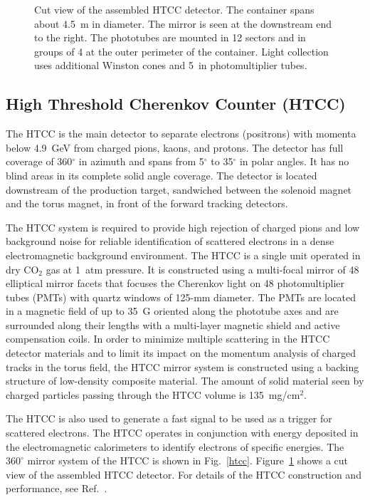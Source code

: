 \documentclass[final,3p,twocolumn]{elsarticle}
\begin{document}
\begin{figure}[htbp!]
\caption{Cut view of the assembled HTCC detector. The container spans about 4.5~m in diameter. The mirror is
seen at the downstream end to the right. The phototubes are mounted in 12 sectors and in groups of 4 at the outer
perimeter of the container. Light collection uses additional Winston cones and 5~in photomultiplier tubes.}
\label{HTCC-container}
\end{figure}

\subsection{High Threshold Cherenkov Counter (HTCC)}

The HTCC is the main detector to separate electrons (positrons) with momenta below 4.9~GeV from charged pions,
kaons, and protons. The detector has full coverage of 360$^\circ$ in azimuth and spans from 5$^\circ$ to 35$^\circ$
in polar angles. It has no blind areas in its complete solid angle coverage. The detector is located downstream of the
production target, sandwiched between the solenoid magnet and the torus magnet, in front of the forward tracking
detectors. 

The HTCC system is required to provide high rejection of charged pions and low background noise for reliable 
identification of scattered electrons in a dense electromagnetic background environment. The HTCC is a single unit
operated in dry CO$_2$ gas at 1~atm pressure. It is constructed using a multi-focal mirror of 48 elliptical mirror
facets that focuses the Cherenkov light on 48 photomultiplier tubes (PMTs) with quartz windows of 125-mm diameter.
The PMTs are located in a magnetic field of up to 35~G oriented along the phototube axes and are surrounded along
their lengths with a multi-layer magnetic shield and active compensation coils. In order to minimize multiple scattering
in the HTCC detector materials and to limit its impact on the momentum analysis of charged tracks in the torus field,
the HTCC mirror system is constructed using a backing structure of low-density composite material. The amount of
solid material seen by charged particles passing through the HTCC volume is 135~mg/cm$^2$. 

The HTCC is also used to generate a fast signal to be used as a trigger for scattered electrons. The HTCC operates
in conjunction with energy deposited in the electromagnetic calorimeters to identify electrons of specific energies.
The $360^\circ$ mirror system of the HTCC is shown in Fig.~\ref{htcc}. Figure~\ref{HTCC-container} shows a cut view
of the assembled HTCC detector. For details of the HTCC construction and performance, see Ref.~\cite{HTCC}.   
\end{document}
